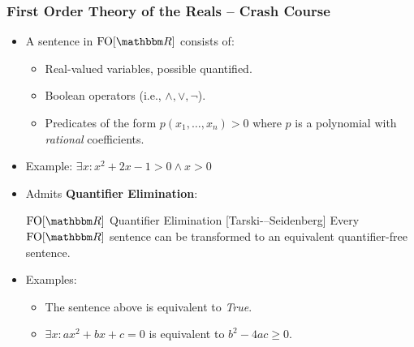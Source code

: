\begin{frame}
	\frametitle{First Order Theory of the Reals -- Crash Course}
	\begin{itemize}[<+->]
		\item A sentence in $\foR$ consists of:
		\begin{itemize}
			\item Real-valued variables, possible quantified.
			\item Boolean operators (i.e., $\wedge,\vee,\neg$).
			\item Predicates of the form $p(x_1,\ldots,x_n)>0$ where $p$ is a polynomial with \emph{rational} coefficients.
		\end{itemize}
	\item Example: $\exists x : x^2+ 2x-1 >0 \wedge x>0$
	\item Admits \textbf{Quantifier Elimination}:
	
	\begin{beamerboxesrounded}[upper=uppercollem,lower=lowercollem,shadow=true]{$\foR$ Quantifier Elimination [Tarski-–Seidenberg]}
		Every $\foR$ sentence can be transformed to an equivalent quantifier-free sentence.
	\end{beamerboxesrounded}

	\item Examples:
	\begin{itemize}
		\item The sentence above is equivalent to \emph{True}.
		\item $\exists x: ax^2+bx+c=0$ is equivalent to $b^2-4ac\ge 0$.
	\end{itemize}
	\end{itemize}
\end{frame}
  
